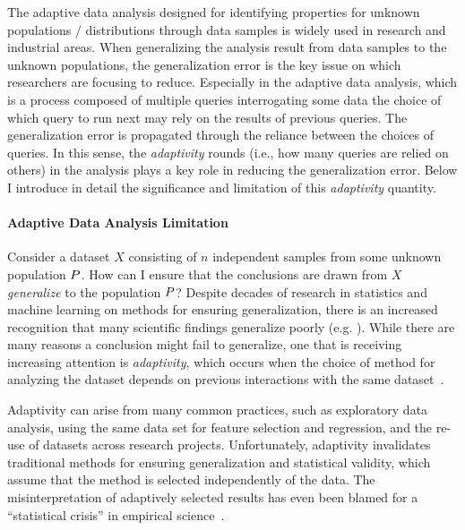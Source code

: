 The adaptive data analysis designed for identifying  properties for unknown populations / distributions 
through data samples is widely 
used in research and industrial areas.
When generalizing the analysis result from data samples to the unknown populations, 
the generalization error is the key issue on which researchers are focusing to reduce.
Especially in the adaptive data analysis,
which is a process composed of 
multiple queries interrogating some data
the choice of which query to run next may rely on the results of previous queries. 
The generalization error is propagated through the reliance between the choices of queries.
In this sense, the \emph{adaptivity} rounds (i.e., how many queries are relied on others) in the analysis plays a key role in reducing the generalization error.
Below I introduce in detail the significance and limitation of this \emph{adaptivity} quantity.
\paragraph{Adaptive Data Analysis Limitation}
\label{subsec:intro-motivation}
Consider a dataset $X$ consisting of $n$ independent samples from some unknown population $P$. How can I ensure that the conclusions are drawn from $X$ \emph{generalize} to the population $P$? Despite decades of research in statistics and machine learning on methods for ensuring generalization, there is an increased recognition that many scientific findings generalize poorly (e.g. 
\cite{Ioannidis05,GelmanL13}
). While there are many reasons a conclusion might fail to generalize, one that is receiving increasing attention is \emph{adaptivity}, which occurs when the choice of method for analyzing the dataset depends on previous interactions with the same dataset~\cite{GelmanL13}.

 Adaptivity can arise from many common practices, such as exploratory data analysis, using the same data set for feature selection and regression, and the re-use of datasets across research projects. Unfortunately, adaptivity invalidates traditional methods for ensuring generalization and statistical validity, which assume that the method is selected independently of the data. The misinterpretation of adaptively selected results has even been blamed for a ``statistical crisis'' in empirical science~\cite{GelmanL13}.

